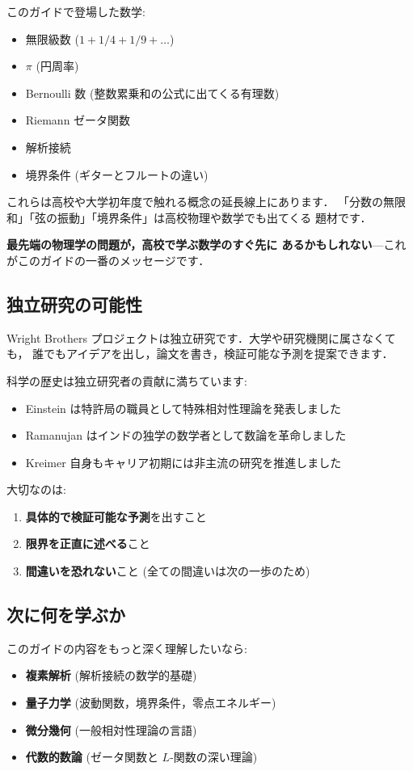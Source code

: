 \documentclass[11pt,a4paper]{article}
\begin{document}
このガイドで登場した数学:
\begin{itemize}
\item 無限級数 ($1 + 1/4 + 1/9 + \ldots$)
\item $\pi$ (円周率)
\item Bernoulli 数 (整数累乗和の公式に出てくる有理数)
\item Riemann ゼータ関数
\item 解析接続
\item 境界条件 (ギターとフルートの違い)
\end{itemize}

これらは高校や大学初年度で触れる概念の延長線上にあります．
「分数の無限和」「弦の振動」「境界条件」は高校物理や数学でも出てくる
題材です．

\textbf{最先端の物理学の問題が，高校で学ぶ数学のすぐ先に
あるかもしれない}---これがこのガイドの一番のメッセージです．

\subsection{独立研究の可能性}

Wright Brothers プロジェクトは独立研究です．大学や研究機関に属さなくても，
誰でもアイデアを出し，論文を書き，検証可能な予測を提案できます．

科学の歴史は独立研究者の貢献に満ちています:
\begin{itemize}
\item Einstein は特許局の職員として特殊相対性理論を発表しました
\item Ramanujan はインドの独学の数学者として数論を革命しました
\item Kreimer 自身もキャリア初期には非主流の研究を推進しました
\end{itemize}

大切なのは:
\begin{enumerate}
\item \textbf{具体的で検証可能な予測}を出すこと
\item \textbf{限界を正直に述べる}こと
\item \textbf{間違いを恐れない}こと (全ての間違いは次の一歩のため)
\end{enumerate}

\subsection{次に何を学ぶか}

このガイドの内容をもっと深く理解したいなら:
\begin{itemize}
\item \textbf{複素解析} (解析接続の数学的基礎)
\item \textbf{量子力学} (波動関数，境界条件，零点エネルギー)
\item \textbf{微分幾何} (一般相対性理論の言語)
\item \textbf{代数的数論} (ゼータ関数と $L$-関数の深い理論)
\end{itemize}
\end{document}
